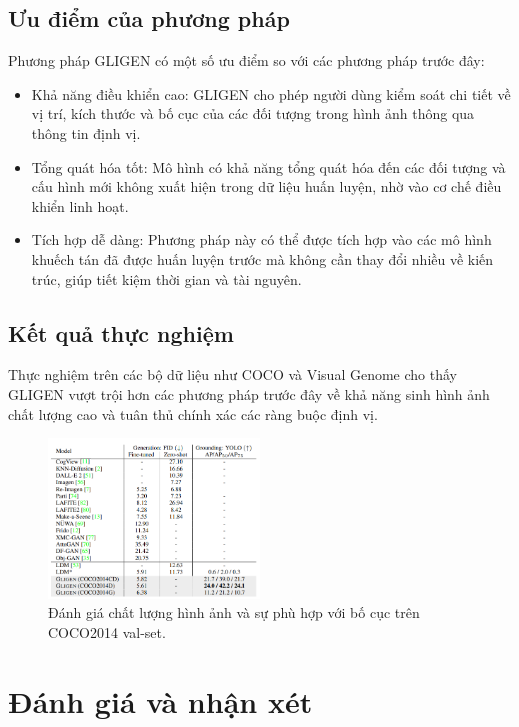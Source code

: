 \documentclass[12pt]{report}
\begin{document}
\section{Ưu điểm của phương pháp}
Phương pháp GLIGEN có một số ưu điểm so với các phương pháp trước đây:
\begin{itemize}
	\item Khả năng điều khiển cao:
	      GLIGEN cho phép người dùng kiểm soát chi tiết về vị trí,
	      kích thước và bố cục của các đối tượng trong hình ảnh thông qua thông tin định vị.
	\item Tổng quát hóa tốt: Mô hình có khả năng tổng quát hóa
	      đến các đối tượng và cấu hình mới không xuất hiện trong dữ liệu huấn luyện,
	      nhờ vào cơ chế điều khiển linh hoạt.
	\item Tích hợp dễ dàng: Phương pháp này có thể được tích hợp vào các mô hình khuếch tán
	      đã được huấn luyện trước mà không cần thay đổi nhiều về kiến trúc,
	      giúp tiết kiệm thời gian và tài nguyên.
\end{itemize}

\section{Kết quả thực nghiệm}
Thực nghiệm trên các bộ dữ liệu như COCO và Visual Genome cho thấy
GLIGEN vượt trội hơn các phương pháp trước đây về khả năng sinh hình ảnh chất lượng cao
và tuân thủ chính xác các ràng buộc định vị.
\begin{figure}[ht]
	\begin{center}
		\includegraphics[width=0.5\textwidth]{COCO2014Comparision.png}
		\caption{Đánh giá chất lượng hình ảnh và sự phù hợp với bố cục
			trên COCO2014 val-set.}\label{fig:COCO2014Comparision}
	\end{center}
\end{figure}

\chapter{Đánh giá và nhận xét}
\end{document}
